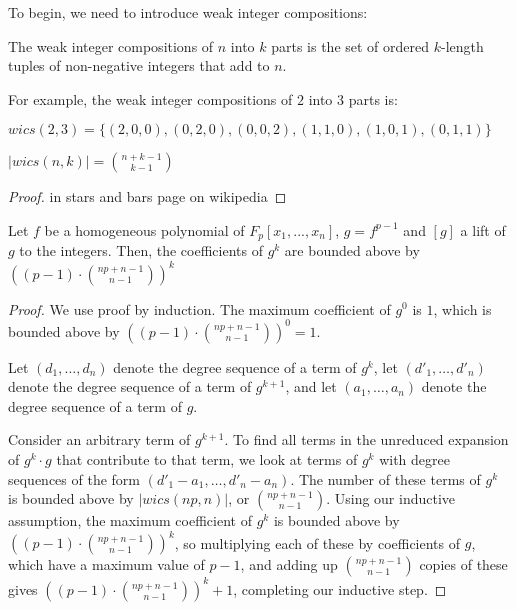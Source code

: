 To begin, we need to introduce weak integer compositions:

\begin{defn}
    The weak integer compositions of $n$ into $k$ parts is the set of ordered $k$-length tuples of non-negative integers that add to $n$.
\end{defn}

For example, the weak integer compositions of $2$ into $3$ parts is:
\begin{center}
    $wics(2, 3) = \lbrace (2, 0, 0), (0, 2, 0), (0, 0, 2), (1, 1, 0), (1, 0, 1), (0, 1, 1) \rbrace$
\end{center}

\begin{lem}
    $|wics(n, k)| = \binom{n + k - 1}{k - 1}$
\end{lem}

\begin{proof}
    in stars and bars page on wikipedia
\end{proof}

\begin{thm}
    Let $f$ be a homogeneous polynomial of $F_p[x_1, ..., x_n]$, $g = f ^ {p - 1}$ and $[g]$ a lift of $g$ to the integers. Then, the coefficients of $g ^ k$ are bounded above by $((p - 1) \cdot \binom{np + n - 1}{n - 1}) ^ k$
\end{thm}

\begin{proof}
    We use proof by induction. The maximum coefficient of $g^0$ is $1$, which is bounded above by $((p - 1) \cdot \binom{np + n - 1}{n - 1}) ^ 0 = 1$.
    
    Let $(d_1, \dots , d_n)$ denote the degree sequence of a term of $g^k$, let $(d'_1, \dots , d'_n)$ denote the degree sequence of a term of $g^{k + 1}$, and let $(a_1, \dots , a_n)$ denote the degree sequence of a term of $g$.

    Consider an arbitrary term of $g^{k + 1}$. To find all terms in the unreduced expansion of $g^k \cdot g$ that contribute to that term, we look at terms of $g^k$ with degree sequences of the form $(d'_1 - a_1, \dots , d'_n - a_n)$. The number of these terms of $g^k$ is bounded above by $|wics(np, n)|$, or $\binom{np + n - 1}{n - 1}$. Using our inductive assumption, the maximum coefficient of $g^k$ is bounded above by $((p - 1) \cdot \binom{np + n - 1}{n - 1}) ^ k$, so multiplying each of these by coefficients of $g$, which have a maximum value of $p - 1$, and adding up $\binom{np + n - 1}{n - 1}$ copies of these gives $((p - 1) \cdot \binom{np + n - 1}{n - 1}) ^ k + 1$, completing our inductive step.
\end{proof}

